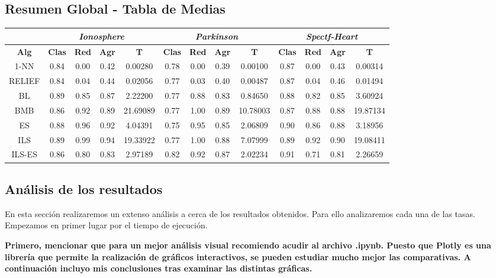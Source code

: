 \documentclass[10pt, a4paper]{article}
\theoremstyle{theorem-style}
\theoremstyle{theorem-style}
\theoremstyle{theorem2-style}
\theoremstyle{definition-style}
\theoremstyle{remark-style}
\theoremstyle{example-style}
\theoremstyle{definition-style}
\theoremstyle{remark-style}
\theoremstyle{remark-style}
\begin{document}
\subsection{Resumen Global - Tabla de Medias}

\begin{table}[h]
\begin{tabular}{ccccc|cccc|cccc}
\centering
 & \multicolumn{4}{c}{\textit{Ionosphere}} & \multicolumn{4}{c}{\textit{Parkinson}} & \multicolumn{4}{c}{\textit{Spectf-Heart}} \\ \hline
\textbf{Alg} & \textbf{Clas} & \textbf{Red} & \textbf{Agr} & \textbf{T} & \textbf{Clas} & \textbf{Red} & \textbf{Agr} & \textbf{T} & \textbf{Clas} & \textbf{Red} & \textbf{Agr} & \textbf{T} \\ \hline
1-NN &	0.84 & 0.00 & 0.42 & 0.00280	& 0.78 & 0.00 & 0.39 & 0.00100	& 0.87 & 0.00 & 0.43 & 0.00314 \\
RELIEF &  0.84 & 0.04 & 0.44 & 0.02056 & 	0.77 & 0.03 & 0.40 & 0.00487 & 0.87 & 0.04 & 0.46 & 0.01494\\
\hline
BL & 0.89 & 0.85 & 0.87 & 2.22200	&0.77 & 0.88 & 0.83 & 0.84650	&	0.88 & 0.82 & 0.85 & 3.60924\\
BMB & 0.86 & 0.92 & 0.89 & 21.69089	& 0.77 & 1.00 & 0.89 & 10.78003	&	0.87 & 0.88 & 0.88 & 19.87134\\
ES & 0.88 & 0.96 & 0.92 & 4.04391	& 0.75 & 0.95 & 0.85 & 2.06809	&	0.90 & 0.86 & 0.88 & 3.18956\\
ILS & 0.89 & 0.99 & 0.94 & 19.33922&	0.77 & 1.00 & 0.88 & 7.07999	&	0.89 & 0.92 & 0.90 & 19.08411\\
ILS-ES & 0.86 & 0.80 & 0.83 & 2.97189	&0.82 & 0.92 & 0.87 & 2.02234	&	0.91 & 0.71 & 0.81 & 2.26659
\end{tabular}
\end{table}

\newpage
\subsection{Análisis de los resultados}

En esta sección realizaremos un extenso análisis a cerca de los resultados obtenidos. Para ello analizaremos cada una de las tasas. Empezamos en primer lugar por el tiempo de ejecución. 

\begin{tcolorbox}
\textbf{Primero, mencionar que para un mejor análisis visual recomiendo acudir al archivo .ipynb. Puesto que Plotly es una librería que permite la realización de gráficos interactivos, se pueden estudiar mucho mejor las comparativas. A continuación incluyo mis conclusiones tras examinar las distintas gráficas.}
\end{tcolorbox}
\end{document}
